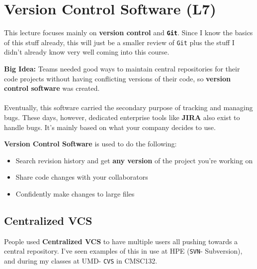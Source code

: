 \documentclass[english, 10pt]{article}
\begin{document}
\section{Version Control Software (L7)}

This lecture focuses mainly on \textbf{version control} and \textbf{\texttt{Git}}. Since I know the basics of this stuff already, this will just be a smaller review of \texttt{Git} plus the stuff I didn't already know very well coming into this course.\\

\begin{myproof}
\textbf{Big Idea:} Teams needed good ways to maintain central repositories for their code projects without having conflicting versions of their code, so \textbf{version control software} was created.\\\\ Eventually, this software carried the secondary purpose of tracking and managing bugs. These days, however, dedicated enterprise tools like \textbf{JIRA} also exist to handle bugs. It's mainly based on what your company decides to use.
\end{myproof}

\textbf{Version Control Software} is used to do the following:
\begin{itemize}
	\item Search revision history and get \textbf{any version} of the project you're working on
	\item Share code changes with your collaborators
	\item Confidently make changes to large files
\end{itemize}

\subsection{Centralized VCS}

People used \textbf{Centralized VCS} to have multiple users all pushing towards a central repository. I've seen examples of this in use at HPE (\texttt{SVN}- Subversion), and during my classes at UMD- \texttt{CVS} in CMSC132.
\end{document}
